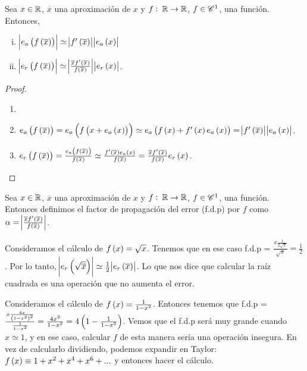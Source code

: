 \begin{prop}\label{prop:1_error_funcion}
  Sea $x \in \mathbb{R}$, $\overline{x}$ una aproximación de $x$ y $f:\: \mathbb{R} \to \mathbb{R}$, $f\in \mathscr{C}^1$, una función. Entonces,
  \begin{enumerate}[i)]
   \item $\abs{e_a\left( f\left(\overline{x}\right)\right)} \simeq \abs{f'\left( \overline{x}\right)}\abs{e_a\left( x\right)}$
   \item $\abs{e_r\left( f\left(\overline{x}\right)\right)} \simeq \abs{\frac{\overline{x}f'\left(\overline{x}\right)}{f\left(\overline{x}\right)}}\abs{e_r\left( x\right)}$.
  \end{enumerate}
\end{prop}
\begin{proof}
  \begin{enumerate}
   \item []
   \item 
      $e_a\left( f\left( \overline{x}\right)\right)  = e_a\left( f\left( x + e_a\left( x\right) \right)\right) \simeq e_a\left( f\left( x\right)  + f'\left( x\right) e_a\left( x\right)\right) = \abs{f'\left( \overline{x}\right)}\abs{e_a\left( x\right)}$.
   \item 
      $e_r\left( f\left( \overline{x}\right) \right)  = \frac{e_a\left( f\left( \overline{x}\right) \right) }{f\left( \overline{x}\right) } \simeq \frac{f'\left( \overline{x}\right) e_a\left( x\right) }{f\left( \overline{x}\right) } = \frac{\overline{x}f'\left( \overline{x}\right) }{f\left( \overline{x}\right) }e_r\left( x\right)$.
  \end{enumerate}
\end{proof}

\begin{defi}
   Sea $x \in \mathbb{R}$, $\overline{x}$ una aproximación de $x$ y $f:\: \mathbb{R} \to \mathbb{R}$, $f\in \mathscr{C}^1$, una función. Entonces definimos el factor de propagación del error (f.d.p) por $f$ como $\alpha = \abs{\frac{\overline{x}f'\left(\overline{x}\right)}{f\left(\overline{x}\right)}}$.
\end{defi}

\begin{example}
      Consideramos el cálculo de $f\left( x\right)  = \sqrt{x}$. Tenemos que en ese caso f.d.p = $\frac{x\frac{1}{2\sqrt{x}}}{\sqrt{x}} = \frac{1}{2}$. Por lo tanto,  $\abs{e_r\left( \sqrt{\overline{x}}\right)} \simeq \frac{1}{2}\abs{e_r\left( \overline{x}\right)}$. Lo que nos dice que calcular la raíz cuadrada es una operación que no aumenta el error.
\end{example}

\begin{example}
      Consideramos el cálculo de $f\left( x\right)  = \frac{1}{1-x^2}$. Entonces tenemos que f.d.p = $\frac{x\frac{4x}{\left( 1-x^2\right) ^2}}{\frac{1}{1-x^2}} = \frac{4x^2}{1-x^2} = 4\left( 1 - \frac{1}{1-x^2}\right) $. Vemos que el f.d.p será muy grande cuando $x \simeq 1$, y en ese caso, calcular $f$ de esta manera sería una operación insegura. En vez de calcularlo dividiendo, podemos expandir en Taylor: $f\left( x\right)  \equiv 1 + x^2 + x^4 + x^6 + ...$ y entonces hacer el cálculo.
\end{example}

